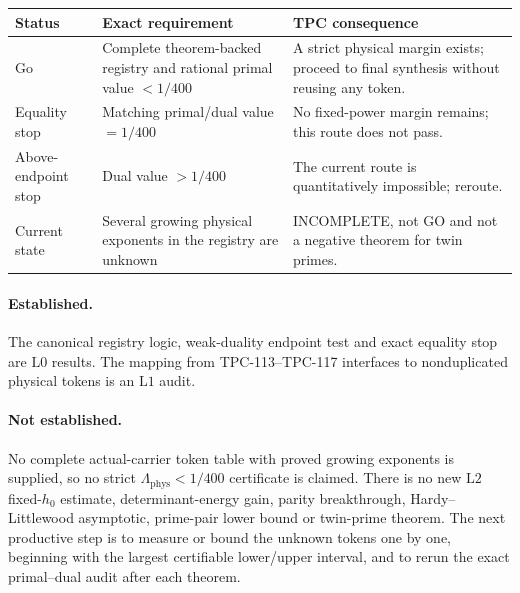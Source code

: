 \documentclass[11pt]{article}
\theoremstyle{definition}
\theoremstyle{remark}
\newcommand{\Lzero}{\mathrm{L0}}
\newcommand{\Lone}{\mathrm{L1}}
\newcommand{\Ltwo}{\mathrm{L2}}
\newcommand{\Lam}{\Lambda_{\mathrm{phys}}}
\begin{document}
\begin{center}
\small
\begin{tabularx}{\textwidth}{@{}p{}p{}X@{}}
\toprule
Status & Exact requirement & TPC consequence\\
\midrule
Go &
Complete theorem-backed registry and rational primal value
\(<1/400\) &
A strict physical margin exists; proceed to final synthesis without
reusing any token.\\
Equality stop &
Matching primal/dual value \(=1/400\) &
No fixed-power margin remains; this route does not pass.\\
Above-endpoint stop &
Dual value \(>1/400\) &
The current route is quantitatively impossible; reroute.\\
Current state &
Several growing physical exponents in the registry are unknown &
INCOMPLETE, not GO and not a negative theorem for twin primes.\\
\bottomrule
\end{tabularx}
\end{center}

\paragraph{Established.}
The canonical registry logic, weak-duality endpoint test and exact
equality stop are \(\Lzero\) results.  The mapping from
TPC-113--TPC-117 interfaces to nonduplicated physical tokens is an
\(\Lone\) audit.

\paragraph{Not established.}
No complete actual-carrier token table with proved growing exponents
is supplied, so no strict \(\Lam<1/400\) certificate is claimed.
There is no new \(\Ltwo\) fixed-\(h_0\) estimate, determinant-energy
gain, parity breakthrough, Hardy--Littlewood asymptotic, prime-pair
lower bound or twin-prime theorem.  The next productive step is to
measure or bound the unknown tokens one by one, beginning with the
largest certifiable lower/upper interval, and to rerun the exact
primal--dual audit after each theorem.

\begingroup
\small
\setlength{\bibsep}{2pt plus 0.3ex}
\sloppy


\endgroup
\end{document}
